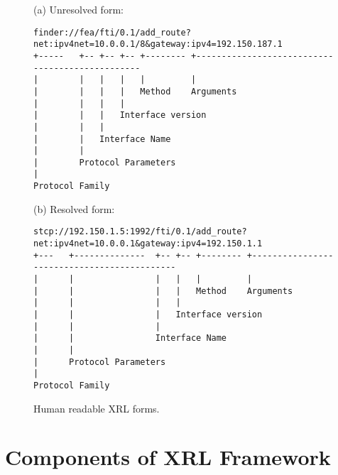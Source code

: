 \documentclass[11pt]{article}
\begin{document}
\clearpage
\begin{sidewaysfigure}
(a) Unresolved form:

\begin{centering}
\small\begin{verbatim}
finder://fea/fti/0.1/add_route?net:ipv4net=10.0.0.1/8&gateway:ipv4=192.150.187.1
+-----   +-- +-- +-- +-------- +------------------------------------------------
|        |   |   |   |         |
|        |   |   |   Method    Arguments
|        |   |   |
|        |   |   Interface version 
|        |   |
|        |   Interface Name  
|        | 
|        Protocol Parameters
|
Protocol Family
\end{verbatim}
\end{centering}
\normalsize

(b) Resolved form:

\small
\begin{verbatim}
stcp://192.150.1.5:1992/fti/0.1/add_route?net:ipv4net=10.0.0.1&gateway:ipv4=192.150.1.1
+---   +--------------  +-- +-- +-------- +--------------------------------------------
|      |                |   |   |         |
|      |                |   |   Method    Arguments
|      |                |   |
|      |                |   Interface version 
|      |                |
|      |                Interface Name  
|      | 
|      Protocol Parameters
|
Protocol Family
\end{verbatim}
\normalsize
\caption{\label{fig:human-readable}Human readable XRL forms.}
\end{sidewaysfigure}
\clearpage

\section{Components of XRL Framework}
\end{document}
